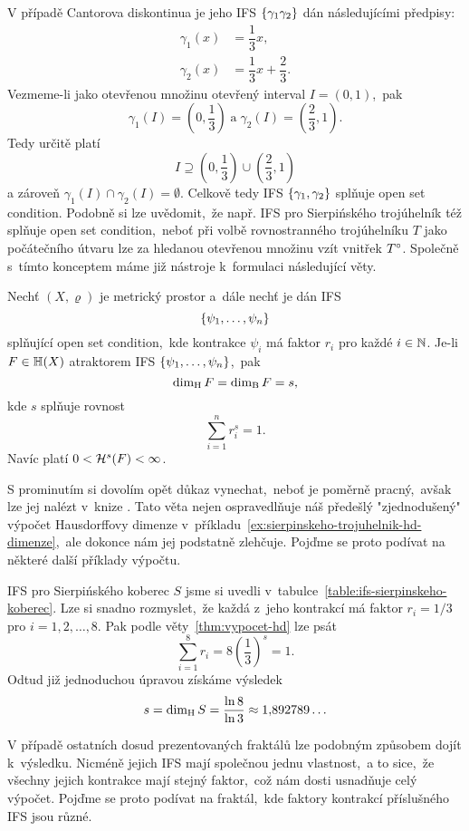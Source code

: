 V případě Cantorova diskontinua je jeho IFS $\left\{\gamma_1\gamma_2\right\}$ dán následujícími předpisy:
\begin{align*}
    \gamma_1(x)&=\dfrac{1}{3}x,\\
    \gamma_2(x)&=\dfrac{1}{3}x+\dfrac{2}{3}.
\end{align*}
Vezmeme-li jako otevřenou množinu otevřený interval $I=(0,1)$,~pak
\[\gamma_1(I)=\left(0,\frac{1}{3}\right)\;\text{a}\;\gamma_2(I)=\left(\frac{2}{3},1\right).\]
Tedy určitě platí
\[I\supseteq\left(0,\frac{1}{3}\right)\cup\left(\frac{2}{3},1\right)\]
a zároveň $\gamma_1(I)\cap\gamma_2(I)=\emptyset$. Celkově tedy IFS $\left\{\gamma_1,\gamma_2\right\}$ splňuje open set condition. Podobně si lze uvědomit,~že např. IFS pro Sierpińského trojúhelník též splňuje open set condition,~neboť při volbě rovnostranného trojúhelníku $T$ jako počátečního útvaru lze za hledanou otevřenou množinu vzít vnitřek $T^\circ$. Společně s~tímto konceptem máme již nástroje k~formulaci následující věty.
\begin{theorem}\label{thm:vypocet-hd}
    Nechť $(X,\varrho)$ je metrický prostor a~dále nechť je dán IFS
    \[\left\{\psi_1,\ldots,\psi_n\right\}\]
    splňující open set condition,~kde kontrakce $\psi_i$ má faktor $r_i$ pro každé $i\in\mathbb{N}$. Je-li $F\in\mathbb{H}(X)$ atraktorem IFS $\left\{\psi_1,\ldots,\psi_n\right\}$,~pak
    \[\operatorname{dim_H}{F}=\operatorname{dim_B}{F}=s,\]
    kde $s$ splňuje rovnost
    \[\sum_{i=1}^{n}r_i^s=1.\]
    Navíc platí $0<\mathcal{H}^{s}(F)<\infty$. 
\end{theorem}
S prominutím si dovolím opět důkaz vynechat,~neboť je poměrně pracný,~avšak lze jej nalézt v~knize \citep[str. 140]{Falconer1989}. Tato věta nejen ospravedlňuje náš předešlý "zjednodušený" výpočet Hausdorffovy dimenze v~příkladu~\ref{ex:sierpinskeho-trojuhelnik-hd-dimenze},~ale dokonce nám jej podstatně zlehčuje. Pojďme se proto podívat na některé další příklady výpočtu.
\begin{example}\label{ex:sierpinskeho-koberec-hd-dimenze}
    IFS pro Sierpińského koberec $S$ jsme si uvedli v~tabulce~\ref{table:ifs-sierpinskeho-koberec}. Lze si snadno rozmyslet,~že každá z~jeho kontrakcí má faktor $r_i=1/3$ pro $i=1,2,\ldots,8$. Pak podle věty~\ref{thm:vypocet-hd} lze psát
    \[\sum_{i=1}^{8}r_i=8\left(\dfrac{1}{3}\right)^s=1.\]
    Odtud již jednoduchou úpravou získáme výsledek
    \[s=\operatorname{dim_H}{S}=\dfrac{\ln{8}}{\ln{3}}\approx1{,}892789\ldots\]
\end{example}
V případě ostatních dosud prezentovaných fraktálů lze podobným způsobem dojít k~výsledku. Nicméně jejich IFS mají společnou jednu vlastnost,~a to sice,~že všechny jejich kontrakce mají stejný faktor,~což nám dosti usnadňuje celý výpočet. Pojďme se proto podívat na fraktál,~kde faktory kontrakcí příslušného IFS jsou různé.
